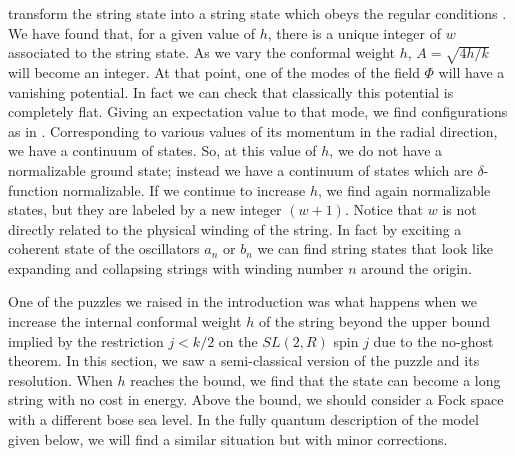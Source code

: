 transform the string state into a string state which obeys the
regular conditions \usualcondition . 
We have found that, for a given value of $h$,
there is a unique integer of $w$ associated to the string state.
As we vary the conformal weight $h$,  $A = \sqrt{4h/k}$
will become an integer. At that point, one of the modes of the 
field $\Phi$ will have a vanishing potential. In fact we can
check that classically this potential is completely flat. Giving an
expectation value to that mode, we find configurations
as in  \criticalsolution. Corresponding to various 
values of its momentum in the radial direction, 
we have a continuum of states.
So, at this value of $h$, we do not have a 
normalizable ground state; instead we 
have a continuum of states which  are $\delta$-function 
normalizable.
If we continue to increase $h$, we find again 
normalizable states, but they are labeled by a new integer 
$(w+1)$.  Notice that $w$ is not directly related to the physical
winding of the string. In fact by exciting a coherent state of 
the oscillators $a_n$ or $b_n$ we can find string states that
look like expanding and collapsing strings with winding number $n$ around
the origin. 


One of the puzzles we raised in the introduction was what
happens when we increase the internal conformal weight $h$ 
of the string beyond the upper bound implied by the restriction 
$ j < k/2$ on the $SL(2,R)$ spin $j$ due to the no-ghost theorem. 
In this section, we saw
a semi-classical version of the puzzle and its resolution.
When $h$  reaches the bound, we find that the state can become 
a long string with no cost in energy. Above the bound, 
we should consider a Fock space  with
a different bose sea level. 
In the fully quantum description of the model given below, 
we will find a similar situation but with 
minor corrections. 




